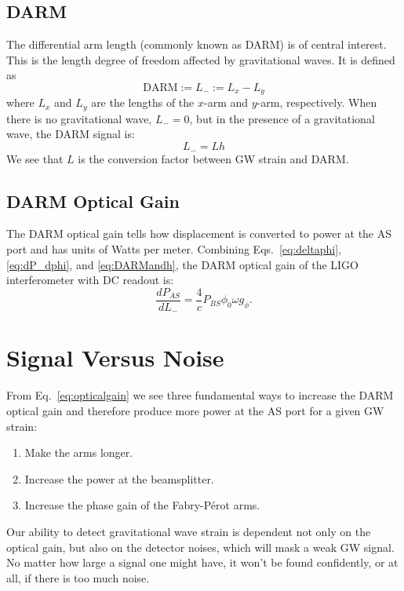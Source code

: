 \subsection{DARM}
The differential arm length (commonly known as DARM) is of central interest. This
is the length degree of freedom affected by gravitational waves. It is
defined as
\begin{equation}
\mathrm{DARM} := L_- := L_x - L_y
\end{equation}
where $L_x$ and $L_y$ are the lengths of the $x$-arm and $y$-arm,
respectively. When there is no gravitational wave, $L_-=0$, but in the
presence of a gravitational wave, the DARM signal is:
\begin{equation}
L_- = Lh
\label{eq:DARMandh}
\end{equation}
We see that $L$ is the conversion factor between GW strain and DARM.



\subsection{DARM Optical Gain}
The DARM optical gain tells how displacement is converted to power at
the AS port and has units of Watts per meter. Combining
Eqs.~\ref{eq:deltaphi}, \ref{eq:dP_dphi}, and \ref{eq:DARMandh}, the
DARM optical gain of the LIGO interferometer with DC readout is:
\begin{equation}
\frac{d P_{AS}}{dL_-} = \frac{4}{c} P_{BS} \phi_0 \omega g_{\phi}.
\label{eq:opticalgain}
\end{equation}




\section{Signal Versus Noise} 
From Eq.~\ref{eq:opticalgain} we see three fundamental
ways to increase the DARM optical gain and therefore produce more
power at the AS port for a given GW strain:
\begin{enumerate}
\item Make the arms longer. \vspace{-10 pt}
\item Increase the power at the beamsplitter. \vspace{-10 pt}
\item Increase the phase gain of the Fabry-P\'{e}rot arms.
\end{enumerate}
Our ability to detect gravitational wave strain is
dependent not only on the optical gain, but also on the detector noises,
which will mask a weak GW signal. No matter how large a
signal one might have, it won't be found confidently, or at all, if
there is too much noise. 


